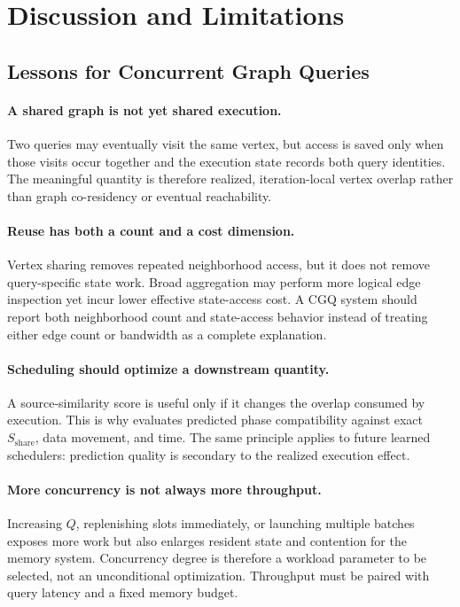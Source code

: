 \section{Discussion and Limitations}
\label{sec:limitations}

\subsection{Lessons for Concurrent Graph Queries}

\paragraph{A shared graph is not yet shared execution.}
Two queries may eventually visit the same vertex, but access is saved only when those visits occur together and the execution state records both query identities.  The meaningful quantity is therefore realized, iteration-local vertex overlap rather than graph co-residency or eventual reachability.

\paragraph{Reuse has both a count and a cost dimension.}
Vertex sharing removes repeated neighborhood access, but it does not remove query-specific state work.  Broad aggregation may perform more logical edge inspection yet incur lower effective state-access cost.  A CGQ system should report both neighborhood count and state-access behavior instead of treating either edge count or bandwidth as a complete explanation.

\paragraph{Scheduling should optimize a downstream quantity.}
A source-similarity score is useful only if it changes the overlap consumed by execution.  This is why \system evaluates predicted phase compatibility against exact $S_{\mathrm{share}}$, data movement, and time.  The same principle applies to future learned schedulers: prediction quality is secondary to the realized execution effect.

\paragraph{More concurrency is not always more throughput.}
Increasing $Q$, replenishing slots immediately, or launching multiple batches exposes more work but also enlarges resident state and contention for the memory system.  Concurrency degree is therefore a workload parameter to be selected, not an unconditional optimization.  Throughput must be paired with query latency and a fixed memory budget.

